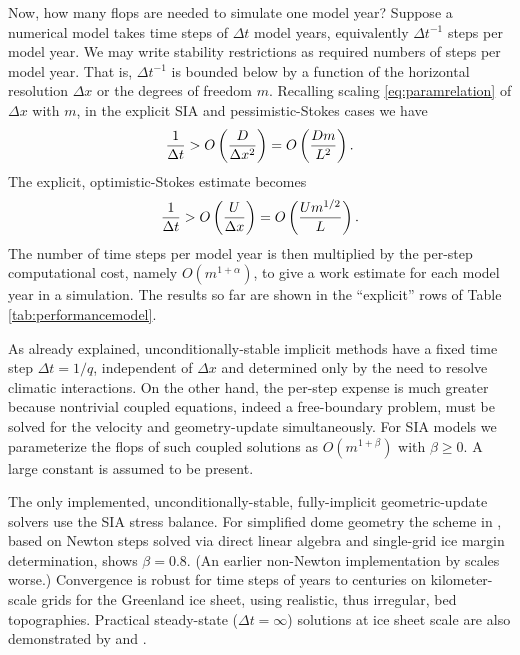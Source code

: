 \documentclass[twocolumn,letterpaper]{igs}
\begin{document}
Now, how many flops are needed to simulate one model year?  Suppose a numerical model takes time steps of $\Delta t$ model years, equivalently $\Delta t^{-1}$ steps per model year.  We may write stability restrictions as required numbers of steps per model year.  That is, $\Delta t^{-1}$ is bounded below by a function of the horizontal resolution $\Delta x$ or the degrees of freedom $m$.  Recalling scaling \eqref{eq:paramrelation} of $\Delta x$ with $m$, in the explicit SIA and pessimistic-Stokes cases we have
\begin{equation}
\frac{1}{\Delta t} > \displaystyle O\left(\frac{D}{\Delta x^2}\right) = \displaystyle O\left(\frac{D m}{L^2}\right). \label{eq:explicitsiarequired}
\end{equation}
The explicit, optimistic-Stokes estimate becomes
\begin{equation}
\frac{1}{\Delta t} > \displaystyle O\left(\frac{U}{\Delta x}\right) = \displaystyle O\left(\frac{U m^{1/2}}{L}\right). \label{eq:explicitoptstokesrequired}
\end{equation}
The number of time steps per model year is then multiplied by the per-step computational cost, namely $O(m^{1+\alpha})$, to give a work estimate for each model year in a simulation.  The results so far are shown in the ``explicit'' rows of Table \ref{tab:performancemodel}.

As already explained, unconditionally-stable implicit methods have a fixed time step $\Delta t = 1/q$, independent of $\Delta x$ and determined only by the need to resolve climatic interactions.  On the other hand, the per-step expense is much greater because nontrivial coupled equations, indeed a free-boundary problem, must be solved for the velocity and geometry-update simultaneously.  For SIA models we parameterize the flops of such coupled solutions as $O(m^{1+\beta})$ with $\beta \ge 0$.  A large constant is assumed to be present.


The only implemented, unconditionally-stable, fully-implicit geometric-update solvers use the SIA stress balance.  For simplified dome geometry the scheme in \cite{Bueler2016}, based on Newton steps solved via direct linear algebra and single-grid ice margin determination, shows $\beta=0.8$.  (An earlier non-Newton implementation by \cite{JouvetBueler2012} scales worse.)  Convergence is robust for time steps of years to centuries on kilometer-scale grids for the Greenland ice sheet, using realistic, thus irregular, bed topographies.  Practical steady-state ($\Delta t=\infty$) solutions at ice sheet scale are also demonstrated by \cite{JouvetBueler2012} and \cite{Bueler2016}.
\end{document}
